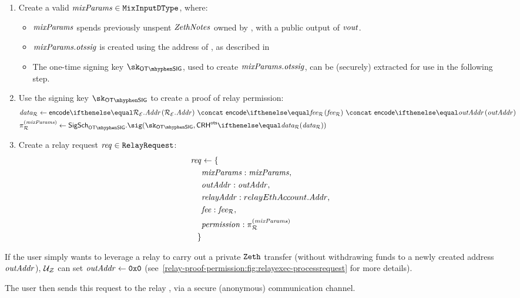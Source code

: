 \begin{enumerate}
  \item Create a valid $\mathit{mixParams} \in {\mathtt{MixInputDType}}$, where:
    \begin{itemize}
      \item $\mathit{mixParams}$ spends previously unspent $\mathit{ZethNotes}$ owned by \userZethAccount{}, with a public output of $\mathit{vout}$.
      \item $\mathit{mixParams}.\mathit{otssig}$ is created using the address of \relayexec{}, as described in \cite[Section 2.3]{zeth-protocol}
      \item The one-time signing key $\sk_\otsig$, used to create $\mathit{mixParams}.\mathit{otssig}$, can be (securely) extracted for use in the following step.
    \end{itemize}
  \item Use the signing key $\sk_\otsig$ to create a proof of relay permission:
    \begin{align*}
      & \relaydata \gets \encode{\relayEthAccount.\addr}{}\ \concat\ \encode{\relayfee}{}\ \concat\ \encode{\outaddr}{} & & \\
      & \prfrelayperm \gets \sigscheme_{\otsig}.\sig(\sk_\otsig, \crhots{\relaydata}) & &
    \end{align*}
  \item Create a relay request $\mathit{req} \in {\mathtt{RelayRequest}}$:
    \begin{align*}
      \mathit{req} & \gets \{ & \\
      & \mathit{mixParams}: \mathit{mixParams}, & \\
      & \mathit{outAddr}: \mathit{outAddr}, & \\
      & \mathit{relayAddr}: relayEthAccount.\mathit{Addr}, & \\
      & \mathit{fee}: \mathit{fee_{\mathcal{R}}}, & \\
      & \mathit{permission}: \pi^{(\mathit{mixParams})}_{\mathcal{R}} & \\
      \} &  &
    \end{align*}
\end{enumerate}

\begin{remark}
    If the user simply wants to leverage a relay to carry out a private $\texttt{Zeth}$ transfer (without withdrawing funds to a newly created address $\mathit{outAddr}$), $\mathcal{{U}_{Z}}{}$ can set $\mathit{outAddr} \gets \mathtt{0x0}$ (see~\cref{relay-proof-permission:fig:relayexec-processrequest} for more details).
\end{remark}

The user then sends this request to the relay \relayP{}, via a secure (anonymous) communication channel.

